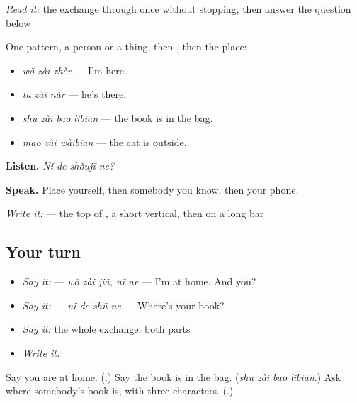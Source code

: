 \begin{tcolorbox}[breakable,skin=enhanced,colback=orange!6,colframe=orange!45!black,boxrule=0.5pt,arc=1mm,left=6pt,right=6pt,top=4pt,bottom=4pt,fonttitle=\bfseries,title={Read this}]
\emph{Read it:} the exchange through once without stopping, then answer the question below
\end{tcolorbox}

\begin{grammarlens}[title={What you've built — one pattern, four places}]
One pattern, a person or a thing, then , then the place:

\begin{itemize}
\raggedright
  \item \textbf{} \emph{wǒ zài zhèr} — I'm here.
  \item \textbf{} \emph{tā zài nàr} — he's there.
  \item \emph{shū zài bāo lǐbian} — the book is in the bag.
  \item \emph{māo zài wàibian} — the cat is outside.
\end{itemize}

\textbf{Listen.} \emph{Nǐ de shǒujī ne?}

\textbf{Speak.} Place yourself, then somebody you know, then your phone.

\emph{Write it:}  — the top of , a short vertical, then  on a long bar
\end{grammarlens}

\subsection*{Your turn}
\begin{itemize}
\raggedright
  \item \emph{Say it:}   — \emph{wǒ zài jiā, nǐ ne} — I'm at home. And you?
  \item \emph{Say it:}  — \emph{nǐ de shū ne} — Where's your book?
  \item \emph{Say it:} the whole exchange, both parts
  \item \emph{Write it:} 
\end{itemize}

\begin{tcolorbox}[breakable,colback=teal!4,colframe=teal!35!black,title={Before you move on}]
Say you are at home. (\textbf{}.) Say the book is in the bag. (\emph{shū zài bāo lǐbian}.) Ask where somebody's book is, with three characters. (\textbf{}.)
\end{tcolorbox}
